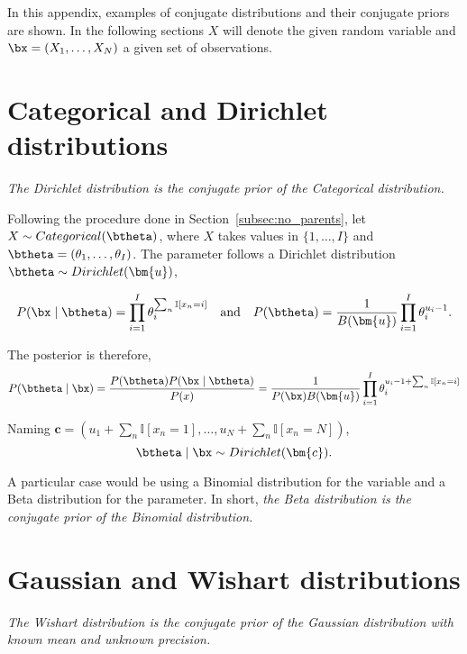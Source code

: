 


In this appendix, examples of conjugate distributions and their conjugate priors are shown. In the following sections \(X\) will denote the given random variable and \(\bx = (X_{1},\dots,X_{N})\) a given set of observations.

\section{Categorical and Dirichlet distributions}

\emph{The Dirichlet distribution is the conjugate prior of the Categorical distribution.}

Following the procedure done in Section~\ref{subsec:no_parents}, let \(X \sim Categorical(\btheta)\), where \(X\) takes values in \(\{1,\dots,I\}\) and \(\btheta = (\theta_{1},\dots,\theta_{I})\). The parameter follows a Dirichlet distribution \(\btheta \sim Dirichlet(\bm{u})\),

\[
  P(\bx \mid \btheta) = \prod_{i=1}^{I}\theta_{i}^{\sum_{n} \mathbb{I}[x_{n}=i]} \quad \text{and} \quad P(\btheta) = \frac{1}{B(\bm{u})}\prod_{i=1}^{I}\theta_{i}^{u_{i}-1}.
\]

The posterior is therefore,
\[
  P(\btheta \mid \bx) = \frac{P(\btheta)P(\bx \mid \btheta)}{P(x)} = \frac{1}{P(\bx)B(\bm{u})}\prod_{i=1}^{I}\theta_{i}^{u_{i}-1 + \sum_{n} \mathbb{I}[x_{n}=i]}
\]

Naming \(\bm{c} = (u_{1} + \sum_{n}\mathbb{I}[x_{n}=1], \dots, u_{N} + \sum_{n}\mathbb{I}[x_{n}=N])\),
\[
  \btheta \mid \bx \sim Dirichlet(\bm{c}).
\]

A particular case would be using a Binomial distribution for the variable and a Beta distribution for the parameter. In short, \emph{the Beta distribution is the conjugate prior of the Binomial distribution.}

\section{Gaussian and Wishart distributions}

\emph{The Wishart distribution is the conjugate prior of the Gaussian distribution with known mean and unknown precision.}

